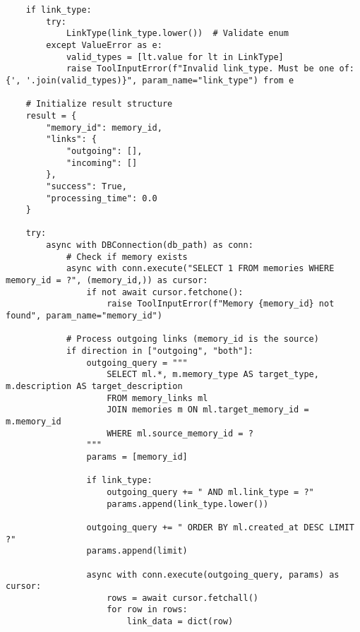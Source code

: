 \documentclass[12pt,a4paper]{article}
\begin{document}
\begin{pageablecode}
\begin{verbatim}
    if link_type:
        try:
            LinkType(link_type.lower())  # Validate enum
        except ValueError as e:
            valid_types = [lt.value for lt in LinkType]
            raise ToolInputError(f"Invalid link_type. Must be one of: {', '.join(valid_types)}", param_name="link_type") from e
    
    # Initialize result structure
    result = {
        "memory_id": memory_id,
        "links": {
            "outgoing": [],
            "incoming": []
        },
        "success": True,
        "processing_time": 0.0
    }
    
    try:
        async with DBConnection(db_path) as conn:
            # Check if memory exists
            async with conn.execute("SELECT 1 FROM memories WHERE memory_id = ?", (memory_id,)) as cursor:
                if not await cursor.fetchone():
                    raise ToolInputError(f"Memory {memory_id} not found", param_name="memory_id")
            
            # Process outgoing links (memory_id is the source)
            if direction in ["outgoing", "both"]:
                outgoing_query = """
                    SELECT ml.*, m.memory_type AS target_type, m.description AS target_description
                    FROM memory_links ml
                    JOIN memories m ON ml.target_memory_id = m.memory_id
                    WHERE ml.source_memory_id = ?
                """
                params = [memory_id]
                
                if link_type:
                    outgoing_query += " AND ml.link_type = ?"
                    params.append(link_type.lower())
                
                outgoing_query += " ORDER BY ml.created_at DESC LIMIT ?"
                params.append(limit)
                
                async with conn.execute(outgoing_query, params) as cursor:
                    rows = await cursor.fetchall()
                    for row in rows:
                        link_data = dict(row)
                        

\end{verbatim}
\end{pageablecode}
\end{document}

